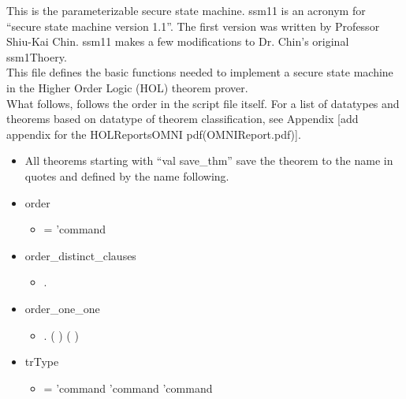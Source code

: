 This is the parameterizable secure state machine. ssm11 is an acronym for “secure
state machine version 1.1”. The first version was written by Professor Shiu-Kai Chin.
ssm11 makes a few modifications to Dr. Chin’s original ssm1Thoery.\\

This file defines the basic functions needed to implement a secure state machine
in the Higher Order Logic (HOL) theorem prover.\\

What follows, follows the order in the script file itself. For a list of datatypes
and theorems based on datatype of theorem classification, see Appendix [add appendix
for the HOLReportsOMNI pdf(OMNIReport.pdf)].\\

\begin{itemize}
\item All theorems starting with “val save_thm” save the theorem to the name in
  quotes and defined by the name following.
\item order
  \begin{itemize}
    \item[]  =  'command \HOLTokenBar{} 
    \end{itemize}
  \item order_distinct_clauses
    \begin{itemize}
    \item[] \HOLTokenTurnstile{} \HOLSymConst{\HOLTokenForall{}}.   \HOLSymConst{\HOLTokenNotEqual{}} 
    \end{itemize}
    \item order_one_one
  \begin{itemize}
    \item[] \HOLTokenTurnstile{} \HOLSymConst{\HOLTokenForall{}} . (  \HOLSymConst{=}  ) \HOLSymConst{\HOLTokenEquiv{}} ( \HOLSymConst{=} )
    \end{itemize}
    \item trType
  \begin{itemize}
    \item[]  =  'command \HOLTokenBar{}  'command \HOLTokenBar{}  'command
    \end{itemize}

\end{itemize}
